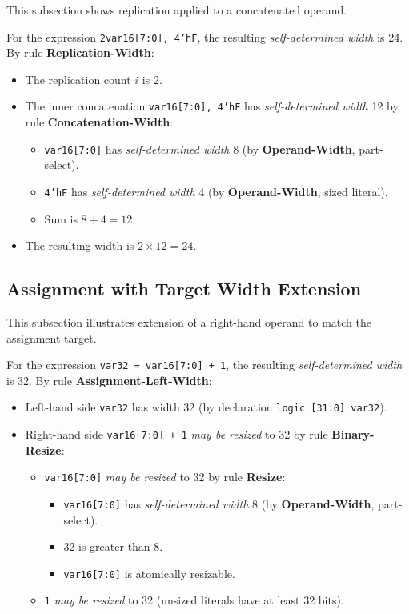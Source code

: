 \documentclass{article}
\newcommand{\sv}[1]{\texttt{#1}}
\newcommand{\sds}{\emph{self-determined width}}
\newcommand{\mbr}{\emph{may be resized}}
\begin{document}
This subsection shows replication applied to a concatenated operand.

For the expression \sv{{2{var16[7:0], 4'hF}}}, the resulting
\sds{} is 24. By rule \textbf{Replication-Width}:
\begin{itemize}
  \item The replication count $i$ is 2.
  \item The inner concatenation \sv{{var16[7:0], 4'hF}} has
    \sds{} 12 by rule \textbf{Concatenation-Width}:
    \begin{itemize}
      \item \sv{var16[7:0]} has \sds{} 8 (by
        \textbf{Operand-Width}, part-select).
      \item \sv{4'hF} has \sds{} 4 (by
        \textbf{Operand-Width}, sized literal).
      \item Sum is $8 + 4 = 12$.
    \end{itemize}
  \item The resulting width is $2 \times 12 = 24$.
\end{itemize}

\subsection{Assignment with Target Width Extension}

This subsection illustrates extension of a right-hand operand to
match the assignment target.

For the expression \sv{var32 = var16[7:0] + 1}, the resulting
\sds{} is 32. By rule \textbf{Assignment-Left-Width}:
\begin{itemize}
  \item Left-hand side \sv{var32} has width 32
    (by declaration \sv{logic [31:0] var32}).
  \item Right-hand side \sv{var16[7:0] + 1} \mbr{} to 32
    by rule \textbf{Binary-Resize}:
    \begin{itemize}
      \item \sv{var16[7:0]} \mbr{} to 32 by rule \textbf{Resize}:
        \begin{itemize}
          \item \sv{var16[7:0]} has \sds{} 8 (by
            \textbf{Operand-Width}, part-select).
          \item 32 is greater than 8.
          \item \sv{var16[7:0]} is atomically resizable.
        \end{itemize}
      \item \sv{1} \mbr{} to 32 (unsized literals have
        at least 32 bits).
    \end{itemize}
\end{itemize}
\end{document}
